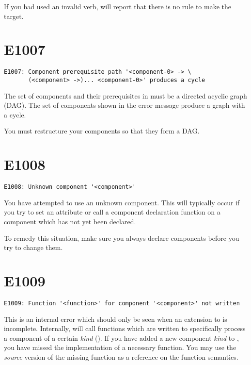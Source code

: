 If you had used an invalid verb, \lmsbw will report that there is no
rule to make the target.

\section{E1007}

\begin{verbatim}
E1007: Component prerequisite path '<component-0> -> \
       (<component> ->)... <component-0>' produces a cycle
\end{verbatim}

The set of components and their prerequisites in \lmsbw must be a
directed acyclic graph (DAG).  The set of components shown in the
error message produce a graph with a cycle.

You must restructure your components so that they form a DAG.

\section{E1008}

\begin{verbatim}
E1008: Unknown component '<component>'
\end{verbatim}

You have attempted to use an unknown component.  This will typically
occur if you try to set an attribute or call a component declaration
function on a component which has not yet been declared.

To remedy this situation, make sure you always declare components
before you try to change them.

\section{E1009}

\begin{verbatim}
E1009: Function '<function>' for component '<component>' not written
\end{verbatim}

This is an internal error which should only be seen when an extension
to \lmsbw is incomplete.  Internally, \lmsbw will call functions which
are written to specifically process a component of a certain
\emph{kind} ().  If you have added a new
component \emph{kind} to \lmsbw, you have missed the implementation of
a necessary function.  You may use the \emph{source} version of the
missing function as a reference on the function semantics.

